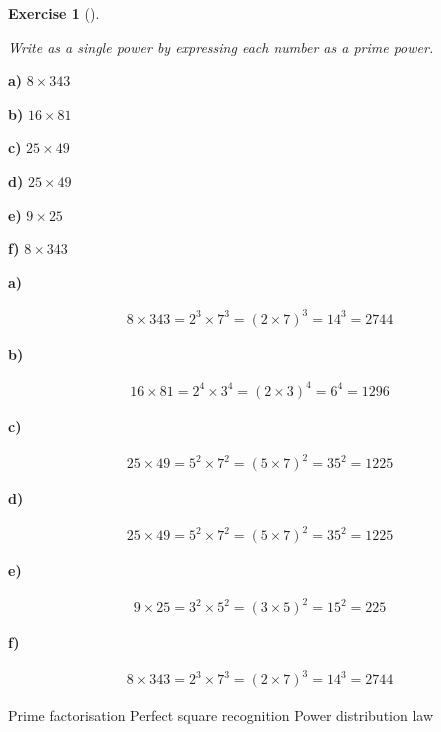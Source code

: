 \documentclass[
  letterpaper,
  DIV=11,
  numbers=noendperiod]{scrreprt}
\theoremstyle{definition}
\newtheorem{exercise}{Exercise}[chapter]
\theoremstyle{remark}
\begin{document}
\begin{exercise}[]\protect\hypertarget{exr-u2-12}{}\label{exr-u2-12}

\emph{Write as a single power by expressing each number as a prime
power.}

\textbf{a)} \(\displaystyle 8 \times 343\)

\textbf{b)} \(\displaystyle 16 \times 81\)

\textbf{c)} \(\displaystyle 25 \times 49\)

\textbf{d)} \(\displaystyle 25 \times 49\)

\textbf{e)} \(\displaystyle 9 \times 25\)

\textbf{f)} \(\displaystyle 8 \times 343\)

\begin{tcolorbox}[enhanced jigsaw, opacitybacktitle=0.6, coltitle=black, arc=.35mm, colframe=quarto-callout-tip-color-frame, colback=white, bottomrule=.15mm, left=2mm, colbacktitle=quarto-callout-tip-color!10!white, titlerule=0mm, opacityback=0, title=\textcolor{quarto-callout-tip-color}{\faLightbulb}\hspace{0.5em}{🔍 View Solutions}, leftrule=.75mm, breakable, rightrule=.15mm, bottomtitle=1mm, toptitle=1mm, toprule=.15mm]

\textbf{a)}

\[
\begin{aligned}
8\times 343=2^{3}\times 7^{3}=(2\times 7)^{3}=14^{3}=2744
\end{aligned}
\]

\textbf{b)}

\[
\begin{aligned}
16\times 81=2^{4}\times 3^{4}=(2\times 3)^{4}=6^{4}=1296
\end{aligned}
\]

\textbf{c)}

\[
\begin{aligned}
25\times 49=5^{2}\times 7^{2}=(5\times 7)^{2}=35^{2}=1225
\end{aligned}
\]

\textbf{d)}

\[
\begin{aligned}
25\times 49=5^{2}\times 7^{2}=(5\times 7)^{2}=35^{2}=1225
\end{aligned}
\]

\textbf{e)}

\[
\begin{aligned}
9\times 25=3^{2}\times 5^{2}=(3\times 5)^{2}=15^{2}=225
\end{aligned}
\]

\textbf{f)}

\[
\begin{aligned}
8\times 343=2^{3}\times 7^{3}=(2\times 7)^{3}=14^{3}=2744
\end{aligned}
\]

\end{tcolorbox}

{Prime factorisation} {Perfect square recognition} {Power distribution
law}

\end{exercise}
\end{document}
